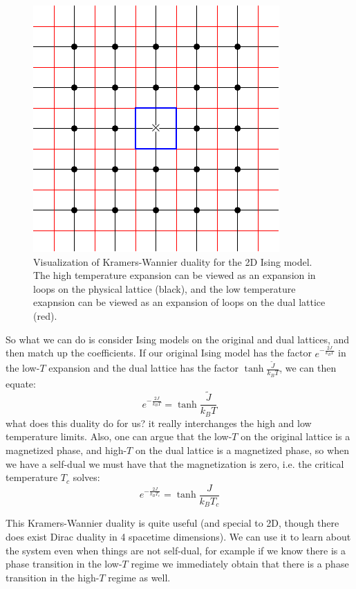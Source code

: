 \begin{figure}[htbp]
    \centering
    \includegraphics{Images/fig-KWduality.pdf}
    \caption{Visualization of Kramers-Wannier duality for the 2D Ising model. The high temperature expansion can be viewed as an expansion in loops on the physical lattice (black), and the low temperature exapnsion can be viewed as an expansion of loops on the dual lattice (red).}
    \label{fig-KWduality}
\end{figure}

So what we can do is consider Ising models on the original and dual lattices, and then match up the coefficients. If our original Ising model has the factor $e^{-\frac{2J}{k_B T}}$ in the low-$T$ expansion and the dual lattice has the factor $\tanh\frac{\tilde{J}}{k_B T}$, we can then equate:
\begin{equation}
    e^{-\frac{2J}{k_B T}} = \tanh\frac{\tilde{J}}{k_B T}
\end{equation}
what does this duality do for us? it really interchanges the high and low temperature limits. Also, one can argue that the low-$T$ on the original lattice is a magnetized phase, and high-$T$ on the dual lattice is a magnetized phase, so when we have a self-dual we must have that the magnetization is zero, i.e. the critical temperature $T_c$ solves:
\begin{equation}
    e^{-\frac{2J}{k_B T_c}} = \tanh\frac{J}{k_B T_c}
\end{equation}

This Kramers-Wannier duality is quite useful (and special to 2D, though there does exist Dirac duality in 4 spacetime dimensions). We can use it to learn about the system even when things are not self-dual, for example if we know there is a phase transition in the low-$T$ regime we immediately obtain that there is a phase transition in the high-$T$ regime as well.

